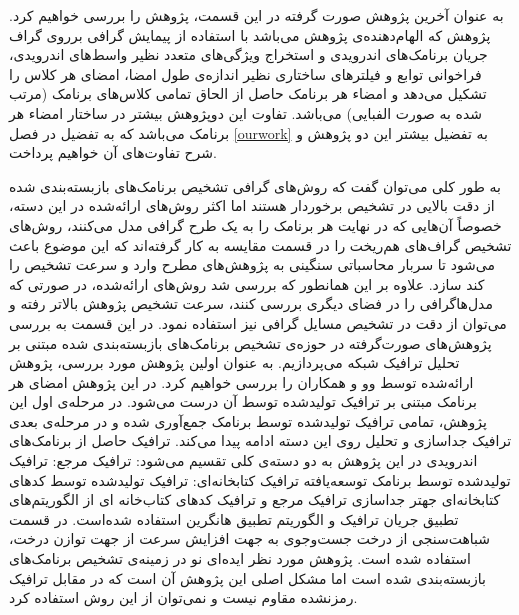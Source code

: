 به عنوان آخرین پژوهش صورت گرفته در این قسمت، پژوهش را بررسی خواهیم کرد. پژوهش  که الهام‌دهنده‌ی پژوهش  می‌باشد با استفاده از پیمایش گرافی برروی گراف‌ جریان برنامک‌های اندرویدی و استخراج ویژگی‌های متعدد نظیر واسط‌های اندرویدی، فراخوانی توابع و فیلتر‌های ساختاری نظیر اندازه‌ی طول امضا، امضا‌ی هر کلاس را تشکیل می‌دهد و امضا‌ء هر برنامک حاصل از الحاق تمامی کلاس‌های برنامک (مرتب شده به صورت الفبایی) می‌باشد. تفاوت این دوپژوهش بیشتر در ساختار امضاء هر برنامک می‌باشد که به تفضیل در فصل 
\ref{ourwork}
به تفضیل بیشتر این دو پژوهش و شرح تفاوت‌های آن خواهیم پرداخت.

به طور کلی می‌توان گفت که روش‌های گرافی تشخیص برنامک‌های بازبسته‌بندی شده از دقت بالایی در تشخیص برخوردار هستند اما اکثر روش‌های ارائه‌شده در این دسته، خصوصاً آن‌هایی که در نهایت هر برنامک را به یک طرح گرافی مدل می‌کنند، روش‌های تشخیص گراف‌های هم‌ریخت را در قسمت مقایسه به کار گرفته‌اند که این موضوع باعث می‌شود تا سربار محاسباتی سنگینی به پژوهش‌های مطرح وارد و سرعت تشخیص را کند سازد. علاوه بر این همانطور که بررسی شد روش‌های ارائه‌شده، در صورتی که مدل‌هاگرافی را در فضای دیگری بررسی کنند، سرعت تشخیص پژوهش بالاتر رفته و می‌توان از دقت در تشخیص مسايل گرافی نیز استفاده نمود.
در این قسمت به بررسی پژوهش‌های صورت‌گرفته در حوزه‌ی تشخیص برنامک‌های بازبسته‌بندی شده مبتنی بر تحلیل ترافیک شبکه می‌پردازیم. به عنوان اولین پژوهش مورد بررسی، پژوهش ارائه‌شده توسط وو و همکاران را بررسی خواهیم کرد. در این پژوهش امضا‌ی هر برنامک مبتنی بر ترافیک  تولیدشده توسط آن درست می‌شود. در مرحله‌ی اول این پژوهش، تمامی ترافیک‌ تولید‌شده توسط برنامک جمع‌آوری شده و در مرحله‌ی بعدی ترافیک  جداسازی و تحلیل روی این دسته ادامه پیدا می‌کند. ترافیک حاصل از برنامک‌های اندرویدی در این پژوهش به دو دسته‌ی کلی تقسیم می‌شود: 
 ترافیک مرجع: ترافیک تولید‌شده توسط برنامک توسعه‌یافته
 ترافیک کتابخانه‌ای: ترافیک تولید‌شده توسط کد‌های کتابخانه‌ای
جهتر جداسازی ترافیک مرجع و ترافیک کد‌های کتاب‌خانه ای از الگوریتم‌های تطبیق جریان ترافیک  و الگوریتم تطبیق هانگرین استفاده شده‌است. در قسمت شباهت‌سنجی از درخت جست‌وجوی  به جهت افزایش سرعت  از جهت توازن درخت، استفاده شده ‌است. پژوهش مورد نظر ایده‌ای نو در زمینه‌ی تشخیص برنامک‌های بازبسته‌بندی شده است اما مشکل اصلی این پژوهش آن است که در مقابل ترافیک رمز‌نشده مقاوم نیست و نمی‌توان از این روش استفاده کرد.
